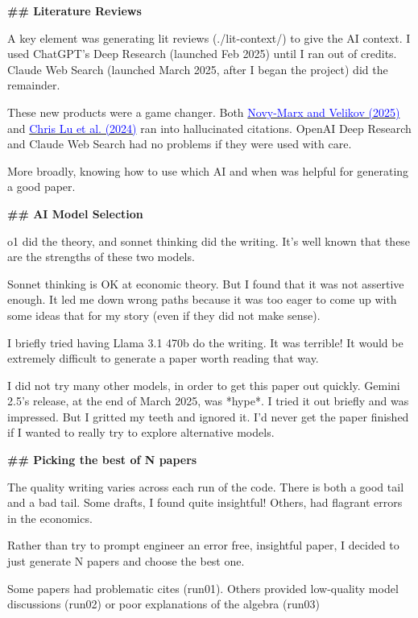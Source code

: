 \begin{mdframed}[linewidth=1pt, linecolor=black]
\textbf{\textcolor{red!70!black}{\#\# Literature Reviews}}

A key element was generating lit reviews (\colorbox{gray!10}{\textcolor{red!70!black}{./lit-context/}}) to give the AI context. I used ChatGPT's Deep Research (launched Feb 2025) until I ran out of credits. Claude Web Search (launched March 2025, after I began the project) did the remainder.

These new products were a game changer. Both \href{https://www.nber.org/papers/w33363}{\textcolor{blue}{Novy-Marx and Velikov (2025)}}  and \href{https://arxiv.org/abs/2408.06292}{\textcolor{blue}{Chris Lu et al. (2024)}} ran into hallucinated citations. OpenAI Deep Research and Claude Web Search had no problems if they were used with care. 

More broadly, knowing how to use which AI and when was helpful for generating a good paper. 

\textbf{\textcolor{red!70!black}{\#\# AI Model Selection }}

o1 did the theory, and sonnet thinking did the writing. It's well known that these are the strengths of these two models. 

Sonnet thinking is OK at economic theory. But I found that it was not assertive enough. It led me down wrong paths because it was too eager to come up with some ideas that for my story (even if they did not make sense).  

I briefly tried having Llama 3.1 470b do the writing. It was terrible! It would be extremely difficult to generate a paper worth reading that way. 

I did not try many other models, in order to get this paper out quickly. Gemini 2.5's release, at the end of March 2025, was *hype*. I tried it out briefly and was impressed. But I gritted my teeth and ignored it. I'd never get the paper finished if I wanted to really try to explore alternative models. 

\textbf{\textcolor{red!70!black}{\#\# Picking the best of N papers}}

The quality writing varies across each run of the code. There is both a good tail and a bad tail. Some drafts, I found quite insightful! Others, had flagrant errors in the economics. 

Rather than try to prompt engineer an error free, insightful paper, I decided to just generate N papers and choose the best one. 

Some papers had problematic cites (\colorbox{gray!10}{\textcolor{red!70!black}{run01}}). Others provided low-quality model discussions (\colorbox{gray!10}{\textcolor{red!70!black}{run02}}) or poor explanations of the algebra (\colorbox{gray!10}{\textcolor{red!70!black}{run03}})


\end{mdframed}
